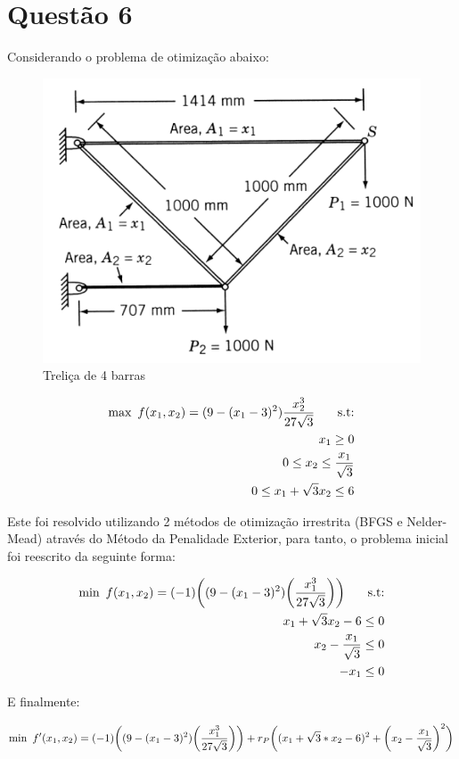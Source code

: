 \documentclass[a4paper, 12pt]{article}
\begin{document}
\section*{Questão 6}
Considerando o problema de otimização abaixo:
\begin{figure}[H]
  \centering
  \includegraphics[width=0.3\linewidth]{6/trelica.png}
  \caption{Treliça de 4 barras}
\end{figure}
\begin{align*}
\begin{split}
\text{max\phantom{0}} f(x_1,x_2) = (9 - (x_1 -3)^2) \frac{x_2^3}{27 \sqrt{3}} \text{\phantom{000} s.t:} \\ 
x_1 \geq 0 \\
0 \leq x_2 \leq \frac{x_1}{\sqrt{3}} \\
0 \leq  x_1 + \sqrt{3}x_2  \leq 6
\end{split}
\end{align*}

Este foi resolvido utilizando 2 métodos de otimização irrestrita (BFGS e Nelder-Mead) através do Método da Penalidade Exterior, para tanto, o problema inicial foi reescrito da seguinte forma:

\begin{align*}
\begin{split}
\text{min\phantom{0}} f(x_1,x_2) = (-1)  \bigg( (9-(x_1-3)^2)  \bigg( \frac{x_1^3}{27 \sqrt{3}} \bigg ) \bigg )  \text{\phantom{000} s.t:}\\
x_1+ \sqrt{3} x_2-6  \leq 0\\
x_2 - \frac{x_1}{\sqrt{3}} \leq 0 \\
-x_1  \leq 0\\
\end{split}
\end{align*}

E finalmente:

\begin{align*}
\begin{split}
\text{min\phantom{0}} f'(x_1,x_2) = (-1)  \bigg( (9-(x_1-3)^2)  \bigg( \frac{x_1^3}{27 \sqrt{3}} \bigg ) \bigg ) + r_P \bigg ( (x_1+ \sqrt{3}*x_2-6)^2 + \bigg (x_2 - \frac{x_1}{\sqrt{3}} \bigg )^2 \bigg )
\end{split}
\end{align*}
\end{document}
